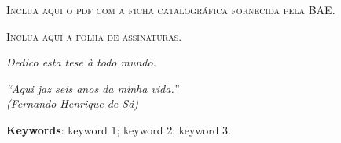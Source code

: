 \imprimircapa


\setcounter{page}{3}
\imprimirfolhaderosto*


\begin{fichacatalografica}
    \vspace*{\fill}
    \begin{center}
        \textsc{Inclua aqui o pdf com a ficha catalográfica fornecida pela BAE.}
    \end{center}
    \vspace*{\fill}
\end{fichacatalografica}


\newpage
\vspace*{\fill}
\begin{center}
    \textsc{Inclua aqui a folha de assinaturas.}
\end{center}
\vspace*{\fill}
\newpage
%
\cleardoublepage


\begin{dedicatoria}
    \vspace*{\fill}
    \centering
    \noindent
    \textit{Dedico esta tese à todo mundo.}
    \vspace*{\fill}
\end{dedicatoria}

\begin{agradecimentos}
    
\end{agradecimentos}

\begin{epigrafe}
    \vspace*{\fill}
    \begin{flushright}
        \textit{``Aqui jaz seis anos da minha vida.''\\
        (Fernando Henrique de Sá)}
    \end{flushright}
\end{epigrafe}

\begin{resumo}
    
    \vspace{\onelineskip}
    \noindent\textbf{Keywords}: keyword 1; keyword 2; keyword 3.
    \vspace{\fill}
\end{resumo}


